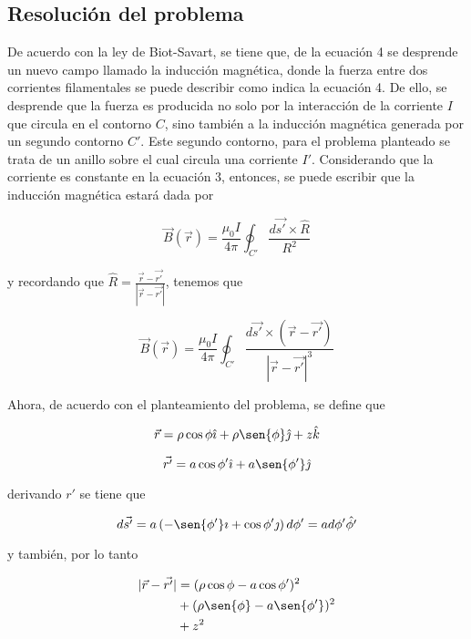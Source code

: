 \documentclass{article}
\begin{document}
\begin{multicols}{2}
\subsection{Resolución del problema}
De acuerdo con la ley de Biot-Savart, se tiene que, de la ecuación 4 se desprende un nuevo campo llamado la inducción magnética, donde la fuerza entre dos corrientes filamentales se puede describir como indica la ecuación 4. De ello, se desprende que la fuerza es producida no solo por la interacción de la corriente $I$ que circula en el contorno $C$, sino también a la inducción magnética generada por un segundo contorno $C'$. Este segundo contorno, para el problema planteado se trata de un anillo sobre el cual circula una corriente $I'$. Considerando que la corriente es constante en la ecuación 3, entonces, se puede escribir que la inducción magnética estará dada por

\begin{equation}
    \vec{B}\left(\vec{r}\right) = \frac{\mu_0 I}{4\pi} \oint_{C'} \frac{d\vec{s'} \times \hat{R}}{R^2}
\end{equation}

y recordando que $\hat{R} = \frac{\vec{r} - \vec{r'}}{|\vec{r} - \vec{r'}|}$, tenemos que

\begin{equation}
    \vec{B}\left(\vec{r}\right) = \frac{\mu_0 I}{4\pi} \oint_{C'} \frac{d\vec{s'} \times (\vec{r} - \vec{r'})}{|\vec{r} - \vec{r'}|^3}
\end{equation}

Ahora, de acuerdo con el planteamiento del problema, se define que

\begin{equation}
    \vec{r} = \rho\cos{\phi}\hat{\imath} + \rho\sen{\phi}\hat{\jmath} + z\hat{k} \\
\end{equation}

\begin{equation}
    \vec{r'} = a\cos{\phi'}\hat{\imath} + a\sen{\phi'}\hat{\jmath}
\end{equation}

derivando $r'$ se tiene que

\begin{equation}
    d\vec{s'} = a\left(-\sen{\phi'}\imath + \cos{\phi'}\jmath\right)d\phi' = ad\phi'\hat{\phi'}
\end{equation}

y también, por lo tanto

\begin{equation}
    \begin{split}
        |\vec{r} - \vec{r'}| & = (\rho\cos{\phi} - a\cos{\phi'})^2 \\
                                & + (\rho\sen{\phi} - a\sen{\phi'})^2 \\
                                & + z^2
    \end{split}
\end{equation}


\end{multicols}
\end{document}
